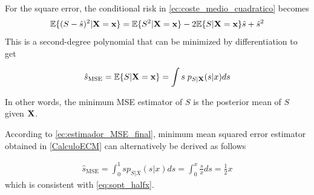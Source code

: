 {For the square error, the conditional risk in \eqref{ec:coste_medio_cuadratico} becomes
\begin{align}
\label{ec:gen_mse2}
\mathbb{E}\{(S-\hat s)^2|{\bf X} = {\bf x} \}
    = \mathbb{E}\{S^2|{\bf X} = {\bf x} \}
    - 2\mathbb{E}\{S|{\bf X} = {\bf x} \} \hat s
    + \hat s^2
\end{align}
This is a second-degree polynomial that can be minimized by differentiation to get}
\begin{framed}
\begin{equation}
\label{ec:estimador_MSE_final}
\hat{s}_\text{MSE} = \mathbb{E}\{S|{\bf X} ={\bf x}\} = \int s\;p_{S|{\bf X}}(s|x) ds
\end{equation}
\end{framed}

In other words, the minimum MSE estimator of $S$ is the posterior mean of $S$ given $\bf X$.



\begin{example}
According to \eqref{ec:estimador_MSE_final}, minimum mean squared error estimator obtained in \ref{CalculoECM} can alternatively be derived as follows

\begin{align}
\label{ec:estimador_MSE_final2}
\hat s_{\text{MSE}} = \int_0^1 s p_{S|X}(s|x) ds   
   = \int_0^x \frac{s}{x} ds 
   = \frac{1}{2} x
\end{align}
which is consistent with \eqref{eq:sopt_halfx}.
\end{example}\vspace{0.4cm}



